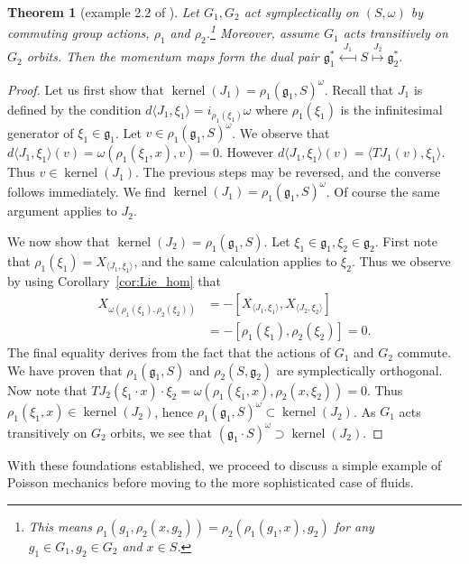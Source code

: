 \documentclass[12pt]{amsart}
\newtheorem{thm}{Theorem}[section]
\DeclareMathOperator{\kernel}{kernel}
\begin{document}
  \begin{thm}[example 2.2 of \cite{Gay-BalmazVizman2011}] \label{thm:commuting_actions}
    Let $G_1,G_2$ act symplectically on $(S,\omega)$
    by commuting group actions,
    $\rho_1$ and $\rho_2$.\footnote{
      This means 
      $\rho_1(g_1 , \rho_2 (x , g_2)) = \rho_2(\rho_1(g_1 , x) ,g_2)$
      for any $g_1 \in G_1, g_2 \in G_2$ and $x \in S$.}
    Moreover, assume $G_1$ acts transitively on $G_2$ orbits.
    Then the momentum maps form the dual pair
    $
      \mathfrak{g}^*_1
      \stackrel{J_1}{\longmapsfrom}
      S
      \stackrel{J_2}{\longmapsto}
      \mathfrak{g}_2^*.
    $
  \end{thm}
  \begin{proof}
    Let us first show that $\kernel(J_1) = \rho_1(\mathfrak{g}_1 , S )^\omega$.
    Recall that $J_1$ is defined by the condition
    $d \langle J_1 , \xi_1 \rangle = i_{\rho_1(\xi_1)} \omega$
    where $\rho_1(\xi_1)$ is the infinitesimal generator of
    $\xi_1 \in \mathfrak{g}_1$.
    Let $v \in \rho_1(\mathfrak{g}_1,S)^\omega$.
    We observe that 
    $d \langle J_1 , \xi_1 \rangle (v) = \omega( \rho_1(\xi_1, x ), v ) = 0$.
    However $d\langle J_1 , \xi_1 \rangle (v) = \langle TJ_1(v) , \xi_1 \rangle$.
    Thus $v \in \kernel(J_1)$.
    The previous steps may be reversed, and
    the converse follows immediately.
    We find
    $\kernel(J_1) = \rho_1(\mathfrak{g}_1,S)^\omega$.
    Of course the same argument applies to $J_2$.

    We now show that $\kernel(J_2) = \rho_1(\mathfrak{g}_1,S)$.
    Let $\xi_1 \in \mathfrak{g}_1, \xi_2 \in \mathfrak{g}_2$.
    First note that $\rho_1(\xi_1) = X_{ \langle J_1 , \xi_1 \rangle}$,
    and the same calculation applies to $\xi_2$.
    Thus we observe by using Corollary~\ref{cor:Lie_hom} that
    \begin{align*}
      X_{ \omega( \rho_1(\xi_1) , \rho_2(\xi_2) ) }
      &= - [X_{ \langle J_1,\xi_1\rangle} , X_{\langle J_2,\xi_2\rangle} ] \\
      &= - [\rho_1(\xi_1) , \rho_2(\xi_2)] = 0.
    \end{align*}
    The final equality
    derives from the fact that the actions of $G_1$ and $G_2$ commute.
    We have proven that $\rho_1(\mathfrak{g}_1 , S)$ and $\rho_2(S,\mathfrak{g}_2)$ are
    symplectically orthogonal.
    Now note that
    $TJ_2 ( \xi_1 \cdot x) \cdot \xi_2 = \omega( \rho_1(\xi_1, x) ,\rho_2(x, \xi_2 )) = 0$.
    Thus $\rho_1(\xi_1 , x) \in \kernel( J_2)$, hence
    $\rho_1(\mathfrak{g}_1 ,S)^\omega \subset \kernel(J_2)$.
    As $G_1$ acts transitively on $G_2$ orbits, we see
    that $(\mathfrak{g}_1 \cdot S)^\omega \supset \kernel( J_2)$.
  \end{proof}
  With these foundations established, we proceed
  to discuss a simple example of Poisson mechanics
  before moving to the more sophisticated case
  of fluids.
\end{document}
